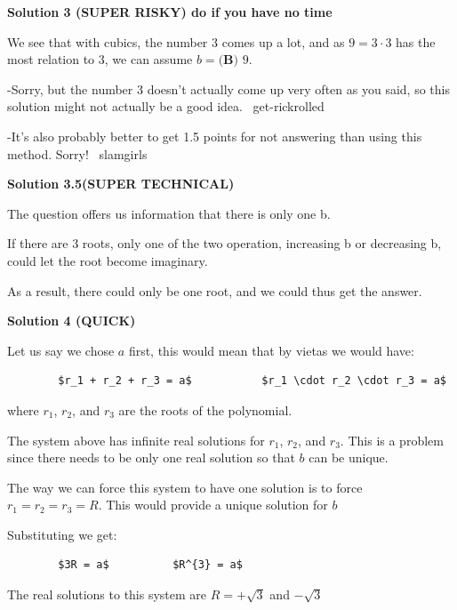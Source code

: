 \begin{enumerate}
 



\textbf{Solution 3 (SUPER RISKY) do if you have no time}

We see that with cubics, the number $3$ comes up a lot, and as $9=3\cdot3$ has the most relation to $3$, we can assume $b=\boxed{\textbf{(B) }9}$.

 -Sorry, but the number $3$ doesn't actually come up very often as you said, so this solution might not actually be a good idea. ~get-rickrolled

 
-It's also probably better to get 1.5 points for not answering than using this method. Sorry! ~slamgirls~

 


 



\textbf{Solution 3.5(SUPER TECHNICAL)}

The question offers us information that there is only one b.

 If there are 3 roots, only one of the two operation, increasing b or decreasing b, could let the root become imaginary.

 As a result, there could only be one root, and we could thus get the answer.

 



\textbf{Solution 4 (QUICK)}

Let us say we chose $a$ first, this would mean that by vietas we would have:

 \begin{verbatim}
		$r_1 + r_2 + r_3 = a$           $r_1 \cdot r_2 \cdot r_3 = a$
\end{verbatim}

where $r_1$, $r_2$, and $r_3$ are the roots of the polynomial.

 The system above has infinite real solutions for $r_1$, $r_2$, and $r_3$. This is a problem since there needs to be only one real solution so that $b$ can be unique.

 The way we can force this system to have one solution is to force $r_1 = r_2 = r_3 = R$. This would provide a unique solution for $b$

 Substituting we get:

 \begin{verbatim}
		$3R = a$          $R^{3} = a$
\end{verbatim}

The real solutions to this system are $R = +\sqrt{3}$ and $-\sqrt{3}$


\end{enumerate}
